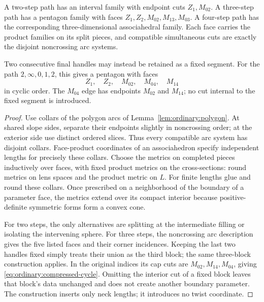 \begin{lemma}
\label{lem:ordinary:metric-families}
A two-step path has an interval family with endpoint cuts
$Z_1,M_{02}$.  A three-step path has a pentagon family with faces
$Z_1,Z_2,M_{02},M_{13},M_{03}$.  A four-step path has the corresponding
three-dimensional associahedral family.  Each face carries the product
families on its split pieces, and compatible simultaneous cuts are
exactly the disjoint noncrossing arc systems.

Two consecutive final handles may instead be retained as a fixed
segment.  For the path $2,\infty,0,1,2$, this gives a pentagon with
faces
\begin{equation}\label{eq:ordinary:compressed-cycle}
 Z_1,\quad Z_2,\quad M_{02},\quad M_{04},\quad M_{14}
\end{equation}
in cyclic order.  The $M_{04}$ edge has endpoints $M_{02}$ and
$M_{14}$; no cut internal to the fixed segment is introduced.
\end{lemma}
\begin{proof}
Use collars of the polygon arcs of
Lemma~\ref{lem:ordinary:polygon}.  At shared slope sides, separate
their endpoints slightly in noncrossing order; at the exterior
side use distinct ordered slices.  Thus every compatible arc
system has disjoint collars.  Face-product coordinates of an
associahedron specify independent lengths for precisely these
collars.  Choose the metrics on completed pieces inductively
over faces, with fixed product metrics on the cross-sections:
round metrics on lens spaces and the product metric on $L$.
For finite lengths glue and round these collars.  Once prescribed
on a neighborhood of the boundary of a parameter face, the
metrics extend over its compact interior because positive-definite
symmetric forms form a convex cone.

For two steps, the only alternatives are splitting at the
intermediate filling or isolating the intervening sphere.
For three steps, the noncrossing arc description gives the five
listed faces and their corner incidences.  Keeping the last two
handles fixed simply treats their union as the third block;
the same three-block construction applies.  In the original
indices its cap cuts are $M_{02},M_{14},M_{04}$, giving
\eqref{eq:ordinary:compressed-cycle}.  Omitting the interior
cut of a fixed block leaves that block's data unchanged and
does not create another boundary parameter.  The construction
inserts only neck lengths; it introduces no twist coordinate.
\end{proof}

